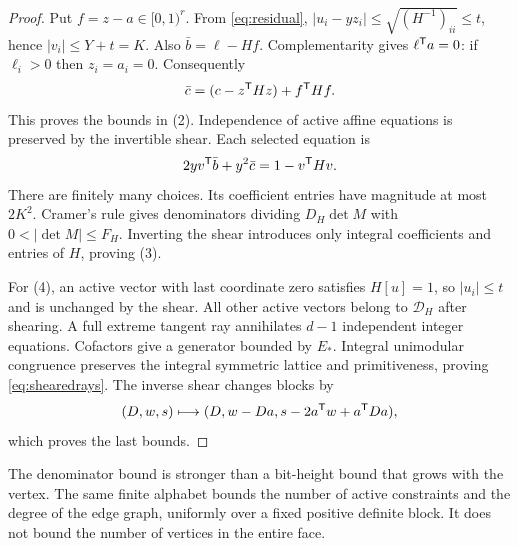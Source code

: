 \begin{proof}
Put $f=z-a\in[0,1)^r$. From \eqref{eq:residual}, $|u_i-yz_i|\le\sqrt{(H^{-1})_{ii}}\le t$, hence $|v_i|\le Y+t=K$. Also $\bar b=\ell-Hf$. Complementarity gives $\ell^{\mathsf T} a=0$: if $\ell_i>0$ then $z_i=a_i=0$. Consequently
\[
 \bar c=(c-z^{\mathsf T} Hz)+f^{\mathsf T} Hf.
\]
This proves the bounds in (2). Independence of active affine equations is preserved by the invertible shear. Each selected equation is
\[
 2yv^{\mathsf T}\bar b+y^2\bar c=1-v^{\mathsf T} Hv.
\]
There are finitely many choices. Its coefficient entries have magnitude at most $2K^2$. Cramer's rule gives denominators dividing $D_H\det M$ with $0<|\det M|\le F_H$. Inverting the shear introduces only integral coefficients and entries of $H$, proving (3).

For (4), an active vector with last coordinate zero satisfies $H[u]=1$, so $|u_i|\le t$ and is unchanged by the shear. All other active vectors belong to $\mathcal D_H$ after shearing. A full extreme tangent ray annihilates $d-1$ independent integer equations. Cofactors give a generator bounded by $E_*$. Integral unimodular congruence preserves the integral symmetric lattice and primitiveness, proving \eqref{eq:shearedrays}. The inverse shear changes blocks by
\[
 (D,w,s)\longmapsto(D,w-Da,s-2a^{\mathsf T} w+a^{\mathsf T} Da),
\]
which proves the last bounds.
\end{proof}

The denominator bound is stronger than a bit-height bound that grows with the vertex. The same finite alphabet bounds the number of active constraints and the degree of the edge graph, uniformly over a fixed positive definite block. It does not bound the number of vertices in the entire face.

